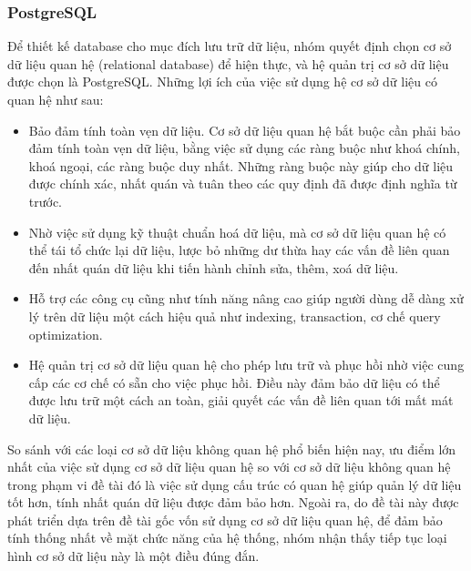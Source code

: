 \subsubsection{PostgreSQL}
Để thiết kế database cho mục đích lưu trữ dữ liệu, nhóm quyết định chọn cơ sở
dữ liệu quan hệ (relational database) để hiện thực, và hệ quản trị cơ sở dữ liệu
được chọn là PostgreSQL. Những lợi ích của việc sử dụng hệ cơ sở dữ liệu có quan
hệ như sau:
\begin{itemize}
  \item Bảo đảm tính toàn vẹn dữ liệu. Cơ sở dữ liệu quan hệ bắt buộc cần phải bảo đảm tính toàn vẹn dữ liệu, bằng việc sử dụng các ràng buộc như khoá chính, khoá ngoại, các ràng buộc duy nhất. Những ràng buộc này giúp cho dữ liệu được chính xác, nhất quán và tuân theo các quy định đã được định nghĩa từ trước.
  \item Nhờ việc sử dụng kỹ thuật chuẩn hoá dữ liệu, mà cơ sở dữ liệu quan hệ có thể tái tổ chức lại dữ liệu, lược bỏ những dư thừa hay các vấn đề liên quan đến nhất quán dữ liệu khi tiến hành chỉnh sửa, thêm, xoá dữ liệu.
  \item Hỗ trợ các công cụ cũng như tính năng nâng cao giúp người dùng dễ dàng xử lý trên dữ liệu một cách hiệu quả như indexing, transaction, cơ chế query optimization.
  \item Hệ quản trị cơ sở dữ liệu quan hệ cho phép lưu trữ và phục hồi nhờ việc cung cấp các cơ chế có sẵn cho việc phục hồi. Điều này đảm bảo dữ liệu có thể được lưu trữ một cách an toàn, giải quyết các vấn đề liên quan tới mất mát dữ liệu.
\end{itemize}
So sánh với các loại cơ sở dữ liệu không quan hệ phổ biến hiện nay, ưu điểm lớn nhất của việc sử dụng cơ sở dữ liệu quan hệ so với cơ sở dữ liệu không quan hệ trong phạm vi đề tài đó là việc sử dụng cấu trúc có quan hệ giúp quản lý dữ liệu tốt hơn, tính nhất quán dữ liệu được đảm bảo hơn. Ngoài ra, do đề tài này được phát triển dựa trên đề tài gốc vốn sử dụng cơ sở dữ liệu quan hệ, để đảm bảo tính thống nhất về mặt chức năng của hệ thống, nhóm nhận thấy tiếp tục loại hình cơ sở dữ liệu này là một điều đúng đắn.